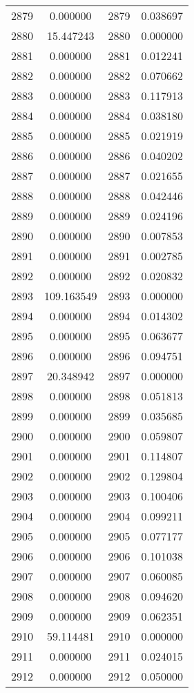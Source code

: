 \documentclass[12pt]{article}
\begin{document}
\begin{longtable}{@{}cccc@{}}
2879 & 0.000000 & 2879 & 0.038697 \\
2880 & 15.447243 & 2880 & 0.000000 \\
2881 & 0.000000 & 2881 & 0.012241 \\
2882 & 0.000000 & 2882 & 0.070662 \\
2883 & 0.000000 & 2883 & 0.117913 \\
2884 & 0.000000 & 2884 & 0.038180 \\
2885 & 0.000000 & 2885 & 0.021919 \\
2886 & 0.000000 & 2886 & 0.040202 \\
2887 & 0.000000 & 2887 & 0.021655 \\
2888 & 0.000000 & 2888 & 0.042446 \\
2889 & 0.000000 & 2889 & 0.024196 \\
2890 & 0.000000 & 2890 & 0.007853 \\
2891 & 0.000000 & 2891 & 0.002785 \\
2892 & 0.000000 & 2892 & 0.020832 \\
2893 & 109.163549 & 2893 & 0.000000 \\
2894 & 0.000000 & 2894 & 0.014302 \\
2895 & 0.000000 & 2895 & 0.063677 \\
2896 & 0.000000 & 2896 & 0.094751 \\
2897 & 20.348942 & 2897 & 0.000000 \\
2898 & 0.000000 & 2898 & 0.051813 \\
2899 & 0.000000 & 2899 & 0.035685 \\
2900 & 0.000000 & 2900 & 0.059807 \\
2901 & 0.000000 & 2901 & 0.114807 \\
2902 & 0.000000 & 2902 & 0.129804 \\
2903 & 0.000000 & 2903 & 0.100406 \\
2904 & 0.000000 & 2904 & 0.099211 \\
2905 & 0.000000 & 2905 & 0.077177 \\
2906 & 0.000000 & 2906 & 0.101038 \\
2907 & 0.000000 & 2907 & 0.060085 \\
2908 & 0.000000 & 2908 & 0.094620 \\
2909 & 0.000000 & 2909 & 0.062351 \\
2910 & 59.114481 & 2910 & 0.000000 \\
2911 & 0.000000 & 2911 & 0.024015 \\
2912 & 0.000000 & 2912 & 0.050000 \\

\end{longtable}
\end{document}
